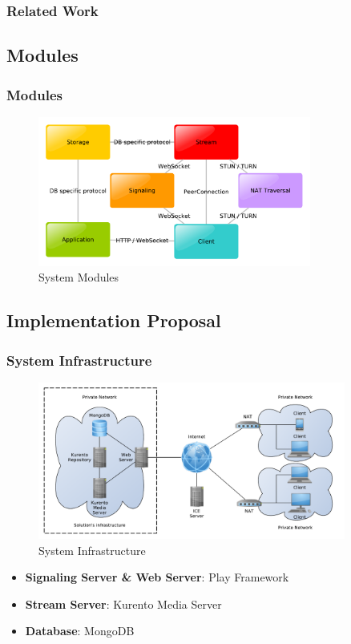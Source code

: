 \documentclass[compress]{beamer}
\begin{document}
\begin{frame}[t,shrink]
\frametitle{Related Work} 
\end{frame}

\subsection{Modules}

	\begin{frame}[c]
		\frametitle{Modules}
		\begin{figure}[H]
			\includegraphics[width=0.8\textwidth]{figures/modules.pdf}
			\caption{System Modules}
		\end{figure}
	\end{frame}

\subsection{Implementation Proposal}

		\begin{frame}[c]
		\frametitle{System Infrastructure}



		\begin{figure}[H]
			\includegraphics[width=0.9\textwidth]{figures/infrastructure.pdf}
			\caption{System Infrastructure}
		\end{figure}

\begin{itemize}
		\item \small \textbf{Signaling Server \& Web Server}: Play Framework
		\item \textbf{Stream Server}: Kurento Media Server		
		\item \textbf{Database}: MongoDB
		\end{itemize}




		\end{frame}
\end{document}
